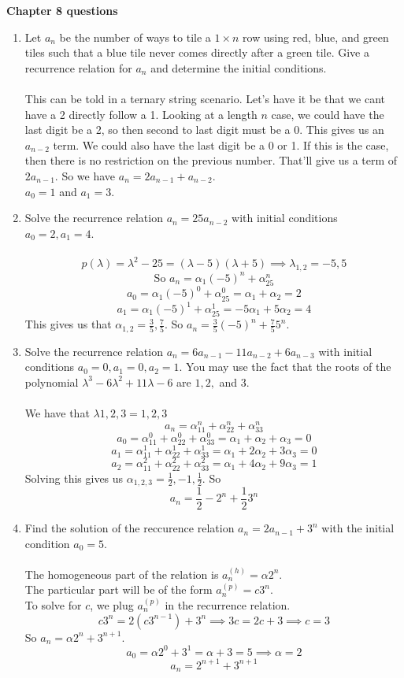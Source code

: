 \documentclass[12pt]{article}
\begin{document}
{\bf Chapter 8 questions}
\begin{enumerate}
\item Let $a_n$ be the number of ways to tile a $1 \times n$ row using red, blue, and green tiles such that a blue tile never comes directly after a green tile. Give a recurrence relation for $a_n$ and determine the initial conditions.\\\\
This can be told in a ternary string scenario. Let's have it be that we cant have a 2 directly follow a 1. Looking at a length $n$ case, we could have the last digit be a 2, so then second to last digit must be a 0. This gives us an $a_{n-2}$ term. We could also have the last digit be a 0 or 1. If this is the case, then there is no restriction on the previous number. That'll give us a term of $2a_{n-1}$. So we have $a_n=2a_{n-1}+a_{n-2}$.\\
$a_0=1$ and $a_1=3$.


\item Solve the recurrence relation $a_{n} = 25a_{n-2}$ with initial conditions $a_0 = 2, a_1 = 4$. \\\\
\[p(\lambda) = \lambda^2-25 = (\lambda-5)(\lambda+5) \implies \lambda_{1,2}=-5,5\]
\[\text{So } a_n=\alpha_1(-5)^n + \alpha_25^n\]
\[a_0=\alpha_1(-5)^0+\alpha_25^0=\alpha_1+\alpha_2=2\]
\[a_1=\alpha_1(-5)^1+\alpha_25^1=-5\alpha_1+5\alpha_2=4\]
This gives us that $\alpha_{1,2}=\frac{3}{5},\frac{7}{5}$. So $a_n=\frac{3}{5}(-5)^n+\frac{7}{5}5^n$.

\item Solve the recurrence relation $a_n = 6a_{n-1} -11a_{n-2} + 6 a_{n-3}$ with initial conditions $a_0 = 0, a_1 = 0, a_2 = 1$. You may use the fact that the roots of the polynomial $\lambda^3 - 6 \lambda^2 + 11\lambda - 6$ are $1,2,$ and $3$.\\\\
We have that $\lambda{1,2,3}=1,2,3$
\[a_n=\alpha_11^n+\alpha_22^n+\alpha_33^n\]
\[a_0=\alpha_11^0+\alpha_22^0+\alpha_33^0=\alpha_1+\alpha_2+\alpha_3=0\]
\[a_1=\alpha_11^1+\alpha_22^1+\alpha_33^1=\alpha_1+2\alpha_2+3\alpha_3=0\]
\[a_2=\alpha_11^2+\alpha_22^2+\alpha_33^2=\alpha_1+4\alpha_2+9\alpha_3=1\]
Solving this gives us $\alpha_{1,2,3}=\frac{1}{2},-1,\frac{1}{2}$. So
\[a_n=\frac{1}{2}-2^n+\frac{1}{2}3^n\]

\item Find the solution of the reccurence relation $a_n = 2a_{n-1} + 3^n$ with the initial condition $a_0 = 5$.\\\\
The homogeneous part of the relation is $a_n^{(h)}=\alpha2^n$.\\
The particular part will be of the form $a_n^{(p)}=c3^n$.\\
To solve for $c$, we plug $a_n^{(p)}$ in the recurrence relation.
\[c3^n=2(c3^{n-1})+3^n \implies 3c=2c +3 \implies c=3\]
So $a_n=\alpha2^n+3^{n+1}$.
\[a_0=\alpha2^0+3^1=\alpha+3=5\implies\alpha=2\]
\[a_n=2^{n+1}+3^{n+1}\]
\end{enumerate}
\end{document}
